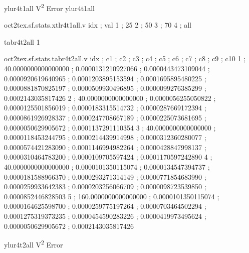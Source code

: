 \expandafter\def\csname oct2tex.sf.stats.ylur4t1all.t\endcsname{ylur4t1all}
\expandafter\def\csname oct2tex.sf.stats.ylur4t1all.u\endcsname{V\textsuperscript{2}}
\expandafter\def\csname oct2tex.sf.stats.ylur4t1all.v\endcsname{Error}
\expandafter\def\csname oct2tex.sf.stats.xtlr4t1all.t\endcsname{ylur4t1all}
\begin{filecontents}[overwrite]{oct2tex.sf.stats.xtlr4t1all.v}
idx ; val
1 ; 25
2 ; 50
3 ; 70
4 ; all
\end{filecontents}
\expandafter\def\csname oct2tex.sf.stats.tabr4t2all.t\endcsname{tabr4t2all}
\expandafter\def\csname oct2tex.sf.stats.tabr4t2all.u\endcsname{1}
\begin{filecontents}[overwrite]{oct2tex.sf.stats.tabr4t2all.v}
idx ; c1 ; c2 ; c3 ; c4 ; c5 ; c6 ; c7 ; c8 ; c9 ; c10
1 ; 40.0000000000000000 ; 0.0000131210927066 ; 0.0000443473109044 ; 0.0000920619640965 ; 0.0001203895153594 ; 0.0001695895480225 ; 0.0000881870825197 ; 0.0000509930496895 ; 0.0000099276385299 ; 0.0002143035817426
2 ; 40.0000000000000000 ; 0.0000056255050822 ; 0.0000125501856019 ; 0.0000183315514732 ; 0.0000287669172394 ; 0.0000861926928337 ; 0.0000247708667189 ; 0.0000225073681695 ; 0.0000050629905672 ; 0.0001137291110354
3 ; 40.0000000000000000 ; 0.0000118453244795 ; 0.0000214439914998 ; 0.0000312360280077 ; 0.0000574421283090 ; 0.0001146994982264 ; 0.0000428847998137 ; 0.0000310464783200 ; 0.0000109705597424 ; 0.0001170597242890
4 ; 40.0000000000000000 ; 0.0000101350115074 ; 0.0000134547394737 ; 0.0000181588966370 ; 0.0000293271314149 ; 0.0000771854683990 ; 0.0000259933642383 ; 0.0000203256066709 ; 0.0000098723539850 ; 0.0000852446828503
5 ; 160.0000000000000000 ; 0.0000101350115074 ; 0.0000164625598700 ; 0.0000259775197264 ; 0.0000703464502294 ; 0.0001275319373235 ; 0.0000454590283226 ; 0.0000419973495624 ; 0.0000050629905672 ; 0.0002143035817426
\end{filecontents}
\expandafter\def\csname oct2tex.sf.stats.ylur4t2all.t\endcsname{ylur4t2all}
\expandafter\def\csname oct2tex.sf.stats.ylur4t2all.u\endcsname{V\textsuperscript{2}}
\expandafter\def\csname oct2tex.sf.stats.ylur4t2all.v\endcsname{Error}
